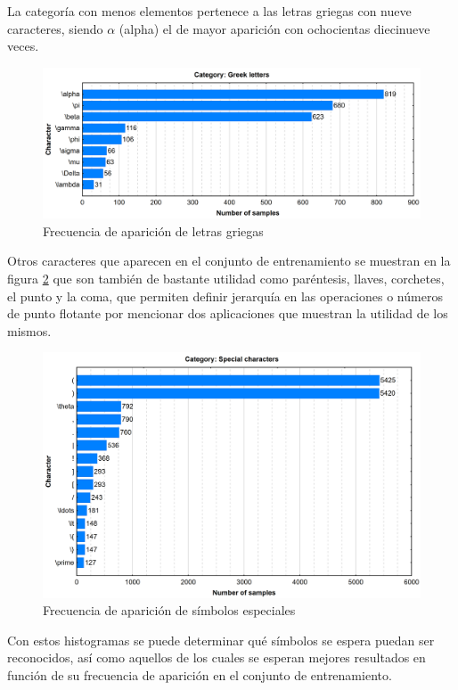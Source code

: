 \newpage
La categoría con menos elementos pertenece a las letras griegas con nueve caracteres, siendo $\alpha$ (alpha) el de mayor aparición con ochocientas diecinueve veces.
\begin{figure}[H]
	\centering
	\includegraphics[width=1\textwidth]{capitulo3/imgs/greek_letters_distribution.png}
	\caption{Frecuencia de aparición de letras griegas}
	\label{fig:GreekLetters}
\end{figure}
\newpage
Otros caracteres que aparecen en el conjunto de entrenamiento se muestran en la figura \ref{fig:SpecialSymbols} que son también de bastante utilidad como paréntesis, llaves, corchetes, el punto y la coma, que permiten definir jerarquía en las operaciones o números de punto flotante por mencionar dos aplicaciones que muestran la utilidad de los mismos. 
\begin{figure}[H]
	\centering
	\includegraphics[width=1\textwidth]{capitulo3/imgs/special_characters_distribution.png}
	\caption{Frecuencia de aparición de símbolos especiales}
	\label{fig:SpecialSymbols}
\end{figure}

Con estos histogramas se puede determinar qué símbolos se espera puedan ser reconocidos, así como aquellos de los cuales se esperan mejores resultados en función de su frecuencia de aparición en el conjunto de entrenamiento.

